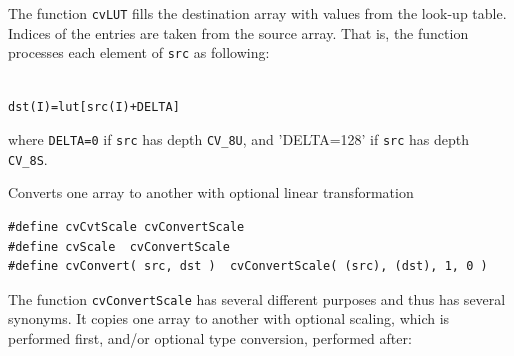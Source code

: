 \begin{description}
\end{description}

The function \texttt{cvLUT} fills the destination array with values from the look-up table. Indices of the entries are taken from the source array. That is, the function processes each element of \texttt{src} as following:

\begin{lstlisting}

dst(I)=lut[src(I)+DELTA]

\end{lstlisting}

where \texttt{DELTA=0} if \texttt{src} has depth \texttt{CV\_8U}, and 'DELTA=128' if \texttt{src} has depth \texttt{CV\_8S}.

\label{ConvertScale}

Converts one array to another with optional linear transformation


\begin{lstlisting}
#define cvCvtScale cvConvertScale
#define cvScale  cvConvertScale
#define cvConvert( src, dst )  cvConvertScale( (src), (dst), 1, 0 )
\end{lstlisting}

\begin{description}
\end{description}


The function \texttt{cvConvertScale} has several different purposes and thus has several synonyms. It copies one array to another with optional scaling, which is performed first, and/or optional type conversion, performed after:

